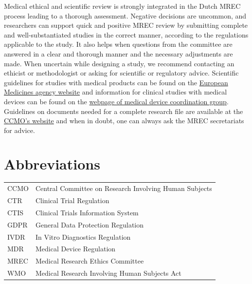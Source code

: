 \documentclass[authordate, meta, issue]{jote-new-article}
\begin{document}
Medical ethical and scientific review is strongly integrated in the Dutch MREC process leading to a thorough assessment. Negative decisions are uncommon, and researchers can support quick and positive MREC review by submitting complete and well-substantiated studies in the correct manner, according to the regulations applicable to the study. It also helps when questions from the committee are answered in a clear and thorough manner and the necessary adjustments are made. When uncertain while designing a study, we recommend contacting an ethicist or methodologist or asking for scientific or regulatory advice. Scientific guidelines for studies with medical products can be found on the \href{https://www.ema.europa.eu/en/human-regulatory/research-development/scientific-guidelines/ich-guidelines}{European Medicines agency website} and information for clinical studies with medical devices can be found on the \href{https://health.ec.europa.eu/medical-devices-dialogue-between-interested-parties/medical-device-coordination-group-working-groups}{webpage of medical device coordination group}. Guidelines on documents needed for a complete research file are available at the \href{https://www.ccmo.nl/}{CCMO's website} and when in doubt, one can always ask the MREC secretariats for advice.




\section{Abbreviations}

\begin{tabularx}{\linewidth}{l X}
  CCMO & Central Committee on Research Involving Human Subjects \\
  CTR  & Clinical Trial Regulation                              \\
  CTIS & Clinical Trials Information System                     \\
  GDPR & General Data Protection Regulation                     \\
  IVDR & In Vitro Diagnostics Regulation                        \\
  MDR  & Medical Device Regulation                              \\
  MREC & Medical Research Ethics Committee                      \\
  WMO  & Medical Research Involving Human Subjects Act
\end{tabularx}
\end{document}
